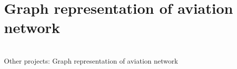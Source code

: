 \section{Graph representation of aviation network}
\begin{frame}[c,noframenumbering]
	\centering
	\begin{titleblock}{}
		~\\%
		{\centering\LARGE Other projects: Graph representation of aviation network\\}%
		~\\%
	\end{titleblock}
\end{frame}
